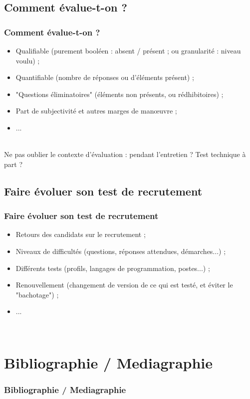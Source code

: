 \documentclass{beamer}
\begin{document}
\subsection{Comment {\'e}value-t-on ?}
\begin{frame}
	\frametitle{Comment {\'e}value-t-on ?}
	\begin{itemize}
		\item Qualifiable (purement bool{\'e}en : absent / pr{\'e}sent ; ou granularit{\'e} : niveau voulu) ; 
		\item Quantifiable (nombre de r{\'e}ponses ou d'{\'e}l{\'e}ments pr{\'e}sent) ; 
		\item "Questions {\'e}liminatoires" ({\'e}l{\'e}ments non pr{\'e}sents, ou r{\'e}dhibitoires) ; 
		\item Part de subjectivit{\'e} et autres marges de man\oe uvre ; 
		\item ... 
	\end{itemize}~\\
	
	Ne pas oublier le contexte d'{\'e}valuation : pendant l'entretien ? Test technique {\`a} part ?
\end{frame}

\subsection{Faire {\'e}voluer son test de recrutement}
\begin{frame}
	\frametitle{Faire {\'e}voluer son test de recrutement}
	\begin{itemize}
		\item Retours des candidats sur le recrutement ; 
		\item Niveaux de difficult{\'e}s (questions, r{\'e}ponses attendues, d{\'e}marches...) ; 
		\item Diff{\'e}rents tests (profils, langages de programmation, postes...) ; 
		\item Renouvellement (changement de version de ce qui est test{\'e}, et {\'e}viter le "bachotage") ; 
		\item ... 
	\end{itemize}~\\
	
\end{frame} 

\def\sectionPartBibliographie{Bibliographie / Mediagraphie}
\section{\sectionPartBibliographie}
\begin{frame}
	\frametitle{\sectionPartBibliographie}
	\nocite{*}
	
	
\end{frame}
\end{document}
